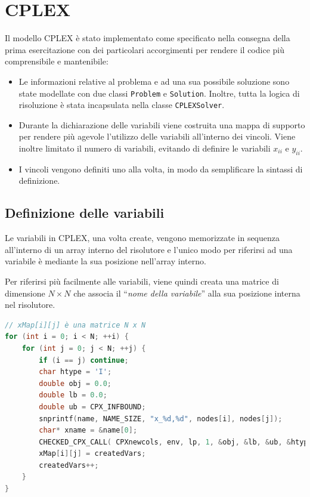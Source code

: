 
\section{CPLEX} \label{sec:cplex}

Il modello CPLEX è stato implementato come specificato nella consegna della prima esercitazione con dei particolari accorgimenti per rendere il codice più comprensibile e mantenibile:

\begin{itemize}
	\item Le informazioni relative al problema e ad una sua possibile soluzione sono state modellate con due classi \texttt{Problem} e \texttt{Solution}. Inoltre, tutta la logica di risoluzione è stata incapsulata nella classe \texttt{CPLEXSolver}.
	\item Durante la dichiarazione delle variabili viene costruita una mappa di supporto per rendere più agevole l'utilizzo delle variabili all'interno dei vincoli. Viene inoltre limitato il numero di variabili, evitando di definire le variabili $x_{ii}$ e $y_{ii}$.
	\item I vincoli vengono definiti uno alla volta, in modo da semplificare la sintassi di definizione.
\end{itemize}

\subsection{Definizione delle variabili}

Le variabili in CPLEX, una volta create, vengono memorizzate in sequenza all'interno di un array interno del risolutore e l'unico modo per riferirsi ad una variabile è mediante la sua posizione nell'array interno.

Per riferirsi più facilmente alle variabili, viene quindi creata una matrice di dimensione $N\times N$ che associa il ``\textit{nome della variabile}'' alla sua posizione interna nel risolutore.

\begin{lstlisting}[language=C++, caption=Creazione delle variabili $x_{ij}$]
// xMap[i][j] è una matrice N x N
for (int i = 0; i < N; ++i) {
	for (int j = 0; j < N; ++j) {
		if (i == j) continue;
		char htype = 'I';
		double obj = 0.0;
		double lb = 0.0;
		double ub = CPX_INFBOUND;
		snprintf(name, NAME_SIZE, "x_%d,%d", nodes[i], nodes[j]);
		char* xname = &name[0];
		CHECKED_CPX_CALL( CPXnewcols, env, lp, 1, &obj, &lb, &ub, &htype, &xname );
		xMap[i][j] = createdVars;
		createdVars++;
	}
}
\end{lstlisting}

